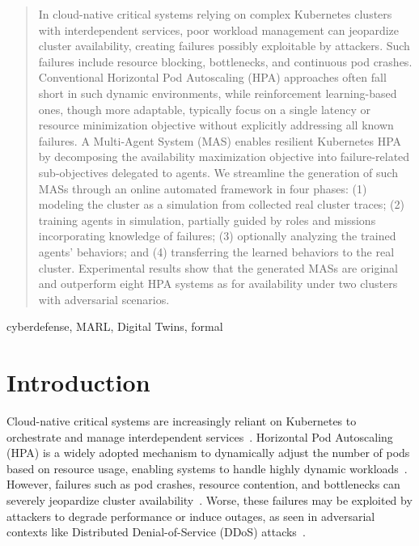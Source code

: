 \documentclass[conference]{IEEEtran}
\begin{document}
\maketitle

\begin{abstract}
  In cloud-native critical systems relying on complex Kubernetes clusters with interdependent services, poor workload management can jeopardize cluster availability, creating failures possibly exploitable by attackers. Such failures include resource blocking, bottlenecks, and continuous pod crashes. Conventional Horizontal Pod Autoscaling (HPA) approaches often fall short in such dynamic environments, while reinforcement learning-based ones, though more adaptable, typically focus on a single latency or resource minimization objective without explicitly addressing all known failures.
  A Multi-Agent System (MAS) enables resilient Kubernetes HPA by decomposing the availability maximization objective into failure-related sub-objectives delegated to agents. We streamline the generation of such MASs through an online automated framework in four phases: (1) modeling the cluster as a simulation from collected real cluster traces; (2) training agents in simulation, partially guided by roles and missions incorporating knowledge of failures; (3) optionally analyzing the trained agents' behaviors; and (4) transferring the learned behaviors to the real cluster.
  Experimental results show that the generated MASs are original and outperform eight HPA systems as for availability under two clusters with adversarial scenarios.
\end{abstract}

\begin{IEEEkeywords}
    cyberdefense, MARL, Digital Twins, formal
\end{IEEEkeywords}

\section{Introduction}
\label{sec:introduction}

Cloud-native critical systems are increasingly reliant on Kubernetes to orchestrate and manage interdependent services~\cite{Pahl2019}. Horizontal Pod Autoscaling (HPA) is a widely adopted mechanism to dynamically adjust the number of pods based on resource usage, enabling systems to handle highly dynamic workloads~\cite{Hohpe2012}. However, failures such as pod crashes, resource contention, and bottlenecks can severely jeopardize cluster availability~\cite{Burns2016}. Worse, these failures may be exploited by attackers to degrade performance or induce outages, as seen in adversarial contexts like Distributed Denial-of-Service (DDoS) attacks~\cite{Koller2019}.
\end{document}
